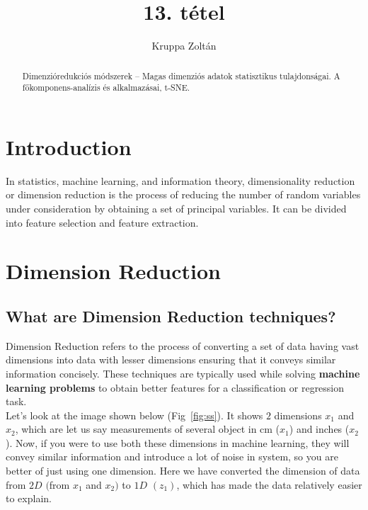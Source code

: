 \documentclass[12pt]{article}
\theoremstyle{plain}
\begin{document}
\title{13. tétel}
\author{Kruppa Zoltán}

\maketitle


\begin{abstract}
    \centering
    Dimenzióredukciós módszerek – Magas dimenziós adatok statisztikus tulajdonságai. A főkomponens-analízis és alkalmazásai, t-SNE.
\end{abstract}

\vfill

\tableofcontents

\newpage

\section{Introduction}

In statistics, machine learning, and information theory, dimensionality reduction or dimension reduction is the process of reducing the number of random variables under consideration by obtaining a set of principal variables. It can be divided into feature selection and feature extraction.\cite{wiki_dim}

\section{Dimension Reduction\cite{dim_red}}
\subsection{What are Dimension Reduction techniques?}

Dimension Reduction refers to the process of converting a set of data having vast dimensions into data with lesser dimensions ensuring that it conveys similar information concisely. These techniques are typically used while solving \textbf{machine learning problems} to obtain better features for a classification or regression task.
\\

Let’s look at the image shown below (Fig~\ref{fig:ss}). It shows $2$ dimensions $x_1$ and $x_2$, which are let us say measurements of several object in cm ($x_1$) and inches ($x_2$). Now, if you were to use both these dimensions in machine learning, they will convey similar information and introduce a lot of noise in system, so you are better of just using one dimension. Here we have converted the dimension of data from $2D$ $($from $x_1$ and $x_2)$ to $1D$ $(z_1)$, which has made the data relatively easier to explain.
\\
\end{document}
